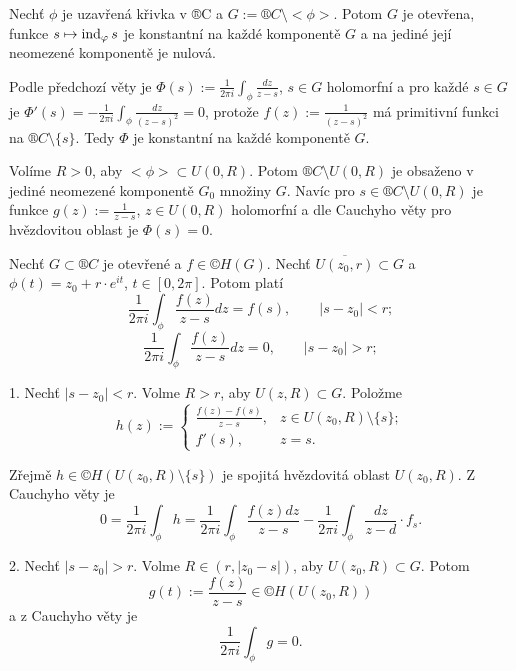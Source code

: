 \documentclass[12pt]{article}					%
\begin{document}
\begin{veta}
	Nechť $\phi$ je uzavřená křivka v ®C a $G := ®C \setminus <\phi>$. Potom $G$ je otevřena, funkce $s \mapsto \operatorname{ind}_\varphi s$ je konstantní na každé komponentě $G$ a na jediné její neomezené komponentě je nulová.

	\begin{dukazin}
		Podle předchozí věty je $\Phi(s) := \frac{1}{2 \pi i} \int_\phi \frac{dz}{z - s}$, $s \in G$ holomorfní a pro každé $s \in G$ je $\Phi'(s) = -\frac{1}{2\pi i} \int_\phi \frac{dz}{(z - s)^2} = 0$, protože $f(z) := \frac{1}{(z - s)^2}$ má primitivní funkci na $®C \setminus \{s\}$. Tedy $\Phi$ je konstantní na každé komponentě $G$.

		Volíme $R > 0$, aby $<\phi> \subset U(0, R)$. Potom $®C \setminus U(0, R)$ je obsaženo v jediné neomezené komponentě $G_0$ množiny $G$. Navíc pro $s \in ®C \setminus U(0, R)$ je funkce $g(z) := \frac{1}{z - s}$, $z \in U(0, R)$ holomorfní a dle Cauchyho věty pro hvězdovitou oblast je $\Phi(s) = 0$.
	\end{dukazin}
\end{veta}


\begin{veta}
	Nechť $G \subset ®C$ je otevřené a $f \in ©H(G)$. Nechť $\overline{U(z_0, r)} \subset G$ a $\phi(t) = z_0 + r·e^{it}$, $t \in [0, 2\pi]$. Potom platí
	$$ \frac{1}{2\pi i} \int_\phi \frac{f(z)}{z - s} dz = f(s), \qquad |s - z_0| < r; $$
	$$ \frac{1}{2\pi i} \int_\phi \frac{f(z)}{z - s} dz = 0, \qquad |s - z_0| > r; $$

	\begin{dukazin}
		1. Nechť $|s - z_0|<r$. Volme $R > r$, aby $U(z, R) \subset G$. Položme
		$$ h(z) := \begin{cases}\frac{f(z) - f(s)}{z - s},& z \in U(z_0, R) \setminus \{s\};\\f'(s),& z = s. \end{cases} $$
		
		Zřejmě $h \in ©H(U(z_0, R) \setminus \{s\})$ je spojitá hvězdovitá oblast $U(z_0, R)$. Z Cauchyho věty je
		$$ 0 = \frac{1}{2\pi i} \int_\phi h = \frac{1}{2\pi i} \int_\phi \frac{f(z) dz}{z - s} - \frac{1}{2\pi i} \int_\phi \frac{dz}{z - d}·f_s. $$

		2. Nechť $|s - z_0| > r$. Volme $R \in (r, |z_0 - s|)$, aby $U(z_0, R) \subset G$. Potom
		$$ g(t) := \frac{f(z)}{z - s} \in ©H(U(z_0, R)) $$
		a z Cauchyho věty je
		$$ \frac{1}{2\pi i} \int_\phi g = 0. $$
	\end{dukazin}
\end{veta}
\end{document}
